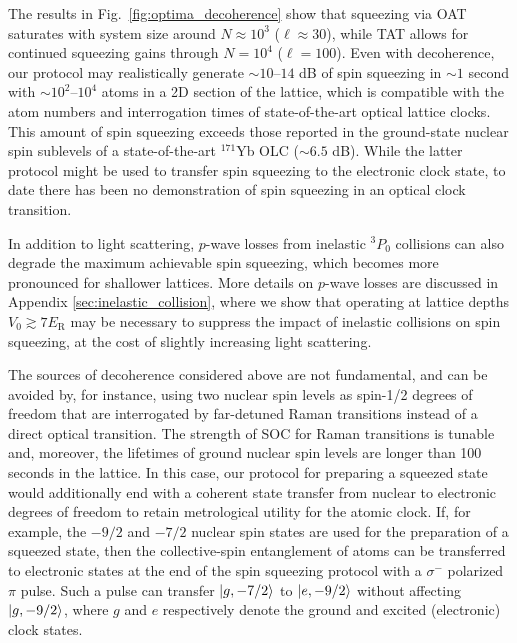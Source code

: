 \documentclass[aps,prx,superscriptaddress,notitlepage,twocolumn,longbibliography]{revtex4-2}
\renewcommand{\t}{\text} %
\renewcommand{\ket}{\Ket}
\begin{document}
The results in Fig.~\ref{fig:optima_decoherence} show that squeezing via OAT saturates with system size around $N\approx10^3$ ($\ell\approx30$), while TAT allows for continued squeezing gains through $N=10^4$ ($\ell=100$).
Even with decoherence, our protocol may realistically generate $\sim10$--$14$ dB of spin squeezing in $\sim1$ second with $\sim10^2$--$10^4$ atoms in a 2D section of the lattice, which is compatible with the atom numbers and interrogation times of state-of-the-art optical lattice clocks\cite{campbell2017fermidegenerate, marti2018imaging}.
This amount of spin squeezing exceeds those reported in the ground-state nuclear spin sublevels of a state-of-the-art ${}^{171}$Yb OLC ($\sim6.5$ dB)\cite{braverman2019nearunitary}.
While the latter protocol might be used to transfer spin squeezing to the electronic clock state, to date there has been no demonstration of spin squeezing in an optical clock transition.

In addition to light scattering, $p$-wave losses from inelastic ${}^3 P_0$ collisions\cite{martin2013quantum, zhang2014spectroscopic, bishof2011inelastic} can also degrade the maximum achievable spin squeezing, which becomes more pronounced for shallower lattices.
More details on $p$-wave losses are discussed in Appendix \ref{sec:inelastic_collision}, where we show that operating at lattice depths $V_0\gtrsim 7 E_{\t{R}}$ may be necessary to suppress the impact of inelastic collisions on spin squeezing, at the cost of slightly increasing light scattering.

The sources of decoherence considered above are not fundamental, and can be avoided by, for instance, using two nuclear spin levels as spin-1/2 degrees of freedom that are interrogated by far-detuned Raman transitions instead of a direct optical transition\cite{mancini2015observation}.
The strength of SOC for Raman transitions is tunable and, moreover, the lifetimes of ground nuclear spin levels are longer than 100 seconds in the lattice\cite{goban2018emergence}.
In this case, our protocol for preparing a squeezed state would additionally end with a coherent state transfer from nuclear to electronic degrees of freedom to retain metrological utility for the atomic clock.
If, for example, the $-9/2$ and $-7/2$ nuclear spin states are used for the preparation of a squeezed state, then the collective-spin entanglement of atoms can be transferred to electronic states at the end of the spin squeezing protocol with a $\sigma^-$ polarized $\pi$ pulse.
Such a pulse can transfer $\ket{g,-7/2}$ to $\ket{e,-9/2}$ without affecting $\ket{g,-9/2}$, where $g$ and $e$ respectively denote the ground and excited (electronic) clock states.
\end{document}
